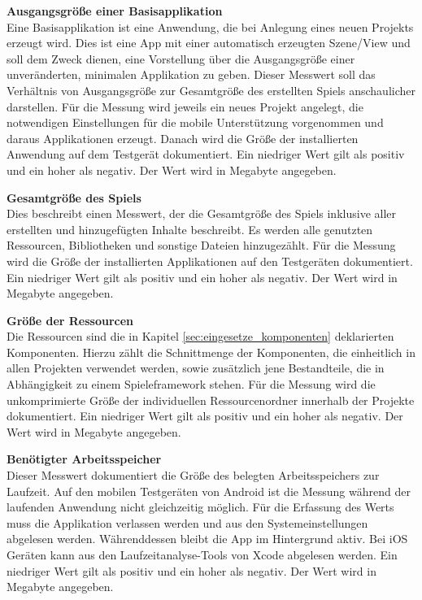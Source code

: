 \bigskip
\textbf{Ausgangsgröße einer Basisapplikation} \\
Eine Basisapplikation ist eine Anwendung, die bei Anlegung eines neuen Projekts erzeugt wird. Dies ist eine App mit einer automatisch erzeugten Szene/View und soll dem Zweck dienen, eine Vorstellung über die Ausgangsgröße einer unveränderten, minimalen Applikation zu geben. Dieser Messwert soll das Verhältnis von Ausgangsgröße zur Gesamtgröße des erstellten Spiels anschaulicher darstellen. Für die Messung wird jeweils ein neues Projekt angelegt, die notwendigen Einstellungen für die mobile Unterstützung vorgenommen und daraus Applikationen erzeugt. Danach wird die Größe der installierten Anwendung auf dem Testgerät dokumentiert. Ein niedriger Wert gilt als positiv und ein hoher als negativ. Der Wert wird in Megabyte angegeben.

\bigskip
\textbf{Gesamtgröße des Spiels} \\
Dies beschreibt einen Messwert, der die Gesamtgröße des Spiels inklusive aller erstellten und hinzugefügten Inhalte beschreibt. Es werden alle genutzten Ressourcen, Bibliotheken und sonstige Dateien hinzugezählt. Für die Messung wird die Größe der installierten Applikationen auf den Testgeräten dokumentiert. Ein niedriger Wert gilt als positiv und ein hoher als negativ. Der Wert wird in Megabyte angegeben.

\bigskip
\textbf{Größe der Ressourcen} \\
Die Ressourcen sind die in Kapitel \ref{sec:eingesetze_komponenten} deklarierten Komponenten. Hierzu zählt die Schnittmenge der Komponenten, die einheitlich in allen Projekten verwendet werden, sowie zusätzlich jene Bestandteile, die in Abhängigkeit zu einem Spieleframework stehen. Für die Messung wird die unkomprimierte Größe der individuellen Ressourcenordner innerhalb der Projekte dokumentiert. Ein niedriger Wert gilt als positiv und ein hoher als negativ. Der Wert wird in Megabyte angegeben.

\bigskip
\textbf{Benötigter Arbeitsspeicher} \\
Dieser Messwert dokumentiert die Größe des belegten Arbeitsspeichers zur Laufzeit. Auf den mobilen Testgeräten von Android ist die Messung während der laufenden Anwendung nicht gleichzeitig möglich. Für die Erfassung des Werts muss die Applikation verlassen werden und aus den Systemeinstellungen abgelesen werden. Währenddessen bleibt die App im Hintergrund aktiv. Bei iOS Geräten kann aus den Laufzeitanalyse-Tools von Xcode abgelesen werden. Ein niedriger Wert gilt als positiv und ein hoher als negativ. Der Wert wird in Megabyte angegeben.

